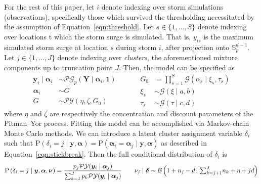 For the rest of this paper, let $i$ denote indexing over storm simulations (observations), 
    specifically those which survived the thresholding necessitated by the assumption of 
    Equation~\eqref{eqn:threshold}.  Let $s \in \lbrace 1, \ldots, S\rbrace$ denote indexing 
    over locations t which the storm surge is simulated.  That is, $y_{is}$ is the maximum simulated
    storm surge at location $s$ during storm $i$, after projection onto $\mathbb{S}_p^{d-1}$.
    Let $j\in \lbrace 1,\ldots,J\rbrace$ denote indexing over \emph{clusters}, the aforementioned
    mixture components up to truncation point $J$.  Then, the model can be specified as
    \begin{equation}
        \label{eqn:pypg}
        \begin{aligned}
            \bm{y}_i \mid \bm{\alpha}_i &\sim
                \mathcal{PG}_p\left(\bm{Y}\mid\bm{\alpha}_i,\bm{1}\right)\\
            \bm{\alpha}_i &\sim G\\
            G &\sim \mathcal{PY}\left(\eta, \zeta, G_0\right)        
        \end{aligned}
        ~\hspace{1cm}
        \begin{aligned}
            G_0 &= {\textstyle\prod}_{s = 1}^{S}\mathcal{G}(\alpha_{s}\mid \xi_{s},\tau_{s})\\
            \xi_{s} &\sim \mathcal{G}(\xi\mid a, b)\\
            \tau_{s} &\sim \mathcal{G}(\tau\mid c, d)
        \end{aligned} 
    \end{equation}
    where $\eta$ and $\zeta$ are respectively the concentration and discount parameters
    of the Pitman--Yor process.  Fitting this model can be accomplished via Markov-chain 
    Monte Carlo methods. We can introduce a latent cluster assignment variable $\delta_i$ 
    such that 
    $\text{P}\left(\delta_i = j\mid\bm{y},\bm{\alpha}\right) = 
        \text{P}\left(\bm{\alpha}_i = \bm{\alpha}_j\mid \bm{y},\bm{\alpha}\right)$ as described in 
        Equation~\eqref{eqn:stickbreak}.
    Then the full conditional distribution of $\delta_i$ is
    \begin{equation}
        \label{eqn:pdelta}
        \text{P}\left(\delta_i = j\mid \bm{y},\bm{\alpha},\bm{\nu}\right) = 
            \frac{p_j\mathcal{PY}(\bm{y}_i\mid\bm{\alpha}_j)}{
                \sum_{k = 1}^J p_k\mathcal{PY}(\bm{y}_i\mid\bm{\alpha}_j)}
                \;\hspace{0.5cm}\;
            \nu_j\mid\bm{\delta} \sim \mathcal{B}\left(1 + n_j - d,\; 
                            {\textstyle \sum}_{k = j+1}^J n_k + \eta + jd\right)
    \end{equation}
